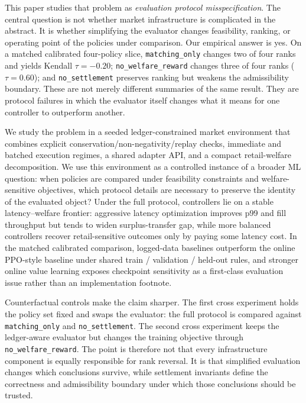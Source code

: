\documentclass[11pt]{article}
\begin{document}
This paper studies that problem as \emph{evaluation protocol misspecification}. The central question is not whether market infrastructure is complicated in the abstract. It is whether simplifying the evaluator changes feasibility, ranking, or operating point of the policies under comparison. Our empirical answer is yes. On a matched calibrated four-policy slice, \texttt{matching\_only} changes two of four ranks and yields Kendall $\tau=-0.20$; \texttt{no\_welfare\_reward} changes three of four ranks ($\tau=0.60$); and \texttt{no\_settlement} preserves ranking but weakens the admissibility boundary. These are not merely different summaries of the same result. They are protocol failures in which the evaluator itself changes what it means for one controller to outperform another.

We study the problem in a seeded ledger-constrained market environment that combines explicit conservation/non-negativity/replay checks, immediate and batched execution regimes, a shared adapter API, and a compact retail-welfare decomposition. We use this environment as a controlled instance of a broader ML question: when policies are compared under feasibility constraints and welfare-sensitive objectives, which protocol details are necessary to preserve the identity of the evaluated object? Under the full protocol, controllers lie on a stable latency--welfare frontier: aggressive latency optimization improves p99 and fill throughput but tends to widen surplus-transfer gap, while more balanced controllers recover retail-sensitive outcomes only by paying some latency cost. In the matched calibrated comparison, logged-data baselines outperform the online PPO-style baseline under shared train / validation / held-out rules, and stronger online value learning exposes checkpoint sensitivity as a first-class evaluation issue rather than an implementation footnote.

Counterfactual controls make the claim sharper. The first cross experiment holds the policy set fixed and swaps the evaluator: the full protocol is compared against \texttt{matching\_only} and \texttt{no\_settlement}. The second cross experiment keeps the ledger-aware evaluator but changes the training objective through \texttt{no\_welfare\_reward}. The point is therefore not that every infrastructure component is equally responsible for rank reversal. It is that simplified evaluation changes which conclusions survive, while settlement invariants define the correctness and admissibility boundary under which those conclusions should be trusted.
\end{document}
